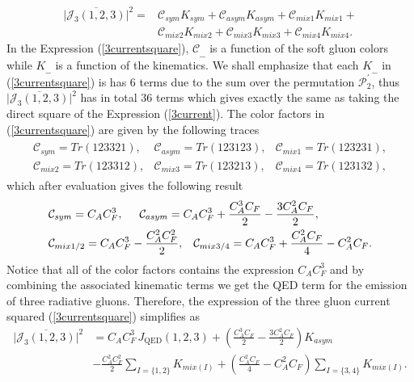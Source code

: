 \begin{align}
\vert \overline{\mathcal{J}_3(1,2,3)} \vert^2= & \mathcal{C}_{sym} K_{sym}+\mathcal{C}_{asym} K_{asym}+ \mathcal{C}_{mix1}K_{mix1} + \nonumber \\ & \mathcal{C}_{mix2}K_{mix2} +\mathcal{C}_{mix3} K_{mix3}+\mathcal{C}_{mix4} K_{mix4}.
\label{3currentsquare}
\end{align} 
In the Expression (\ref{3currentsquare}), $\mathcal{C}_{\_\_}$ is a function of the soft gluon colors while $K_{\_\_}$ is a function of the kinematics. We shall emphasize that each $K_{\_\_}$ in (\ref{3currentsquare}) is has $6$ terms due to the sum over the permutation $\mathcal{P}^{'}_2$, thus $\vert \overline{\mathcal{J}_3(1,2,3)} \vert^2$ has  in total $36$ terms which gives exactly the same as taking the direct square of the Expression (\ref{3current}). The color factors in (\ref{3currentsquare}) are given by the following traces
\begin{align}
\begin{array}{ccc}
\mathcal{C}_{sym}=Tr(123321), & \mathcal{C}_{asym}=Tr(123123), & \mathcal{C}_{mix1}=Tr(123231), \\
\mathcal{C}_{mix2}=Tr(123312), & \mathcal{C}_{mix3}=Tr(123213), & \mathcal{C}_{mix4}=Tr(123132),
\end{array}
\end{align}
which after evaluation gives the following result 
\begin{align}
& \mathcal{C}_{sym}=C_AC^3_F, \hspace*{0.5cm}\mathcal{C}_{asym}=C_AC^3_F+\frac{C^3_AC_F}{2}-\frac{3C^2_AC_F}{2},\\
& \mathcal{C}_{mix1/2}=C_AC^3_F-\frac{C^2_A C^2_F}{2}, \hspace*{0.3cm} \mathcal{C}_{mix3/4}=C_AC^3_F+\frac{C^2_AC_F}{4}-C^2_AC_F.
\end{align}
Notice that all of the color factors contains the expression $C_AC^3_F$ and by combining the associated kinematic terms we get the QED term for the emission of three radiative gluons. Therefore, the expression of the three gluon current squared (\ref{3currentsquare}) simplifies as
\begin{align}
\vert \overline{\mathcal{J}_3(1,2,3)} \vert^2 &= C_A C^3_F \, J_{\text{QED}}(1,2,3) + \left( \frac{C^3_AC_F}{2}-\frac{3C^2_AC_F}{2} \right) K_{asym}  \nonumber \\ 
& -\frac{C^2_A C^2_F}{2} \sum_{I=\{1,2\}} K_{mix(I)} +\left( \frac{C^2_AC_F}{4}-C^2_AC_F \right) \sum_{I=\{3,4\}} K_{mix(I)}.
\end{align} 
